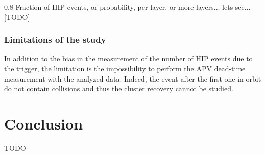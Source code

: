                  {0.8}       %
                 {Fraction of HIP events, or probability, per layer, or more layers... lets see... [TODO] } %

\subsubsection{Limitations of the study}
 
In addition to the bias in the measurement of the number of HIP events due to the trigger, the limitation is the impossibility to perform the APV dead-time measurement with the analyzed data. Indeed, the event after the first one in orbit do not contain collisions and thus the cluster recovery cannot be studied. 

\section{Conclusion}
TODO



